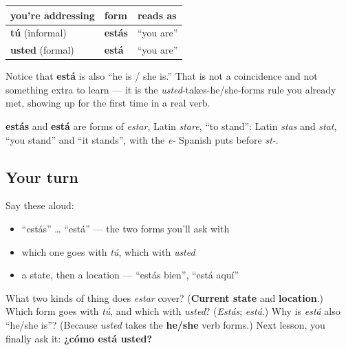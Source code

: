 \begin{grammarlens}[title={Grammar Lens: the two forms you need}]
\noindent
\begin{tabularx}{\linewidth}{@{}>{\raggedright\arraybackslash}X>{\raggedright\arraybackslash}X>{\raggedright\arraybackslash}X@{}}
\toprule
\textbf{you're addressing} & \textbf{form} & \textbf{reads as} \\
\midrule
\textbf{tú} (informal) & \textbf{estás} & \textquotedblleft{}you are\textquotedblright{} \\
\textbf{usted} (formal) & \textbf{está} & \textquotedblleft{}you are\textquotedblright{} \\
\bottomrule
\end{tabularx}

Notice that \textbf{está} is also \textquotedblleft{}he is / she is.\textquotedblright{} That is not a coincidence and not something extra to learn — it is the \emph{usted}-takes-he/she-forms rule you already met, showing up for the first time in a real verb.
\end{grammarlens}

\begin{cousinweb}
\textbf{estás} and \textbf{está} are forms of \emph{estar}, Latin \emph{stare}, \textquotedblleft{}to stand\textquotedblright{}: Latin \emph{stas} and \emph{stat}, \textquotedblleft{}you stand\textquotedblright{} and \textquotedblleft{}it stands\textquotedblright{}, with the \emph{e-} Spanish puts before \emph{st-}.
\end{cousinweb}

\subsection*{Your turn}
Say these aloud:

\begin{itemize}
\raggedright
  \item \textquotedblleft{}estás\textquotedblright{} … \textquotedblleft{}está\textquotedblright{} — the two forms you'll ask with
  \item which one goes with \emph{tú}, which with \emph{usted}
  \item a state, then a location — \textquotedblleft{}estás bien\textquotedblright{}, \textquotedblleft{}está aquí\textquotedblright{}
\end{itemize}

\begin{tcolorbox}[breakable,colback=teal!4,colframe=teal!35!black,title={Before you move on}]
What two kinds of thing does \emph{estar} cover? (\textbf{Current state} and \textbf{location}.) Which form goes with \emph{tú}, and which with \emph{usted}? (\emph{Estás}; \emph{está}.) Why is \emph{está} also \textquotedblleft{}he/she is\textquotedblright{}? (Because \emph{usted} takes the \textbf{he/she} verb forms.) Next lesson, you finally ask it: \textbf{¿cómo está usted?}
\end{tcolorbox}
